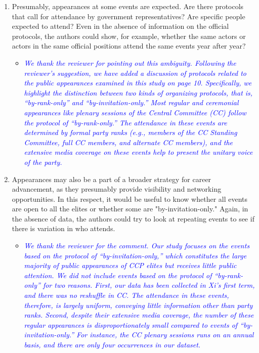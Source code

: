 \begin{enumerate}
 \item Presumably, appearances at some events are expected. Are there protocols that call for attendance by government representatives? Are specific people expected to attend?  Even in the absence of information on the official protocols, the authors could show, for example, whether the same actors or actors in the same official positions attend the same events year after year?
	\begin{itemize}
		\item \textcolor{blue}{ \emph{
			We thank the reviewer for pointing out this ambiguity.  Following the reviewer's suggestion, we have added a discussion of protocols related to the public appearances examined in this study on page 10.  Specifically, we highlight the distinction between two kinds of organizing protocols, that is, “by-rank-only” and “by-invitation-only.”  Most regular and ceremonial appearances like plenary sessions of the Central Committee (CC) follow the protocol of “by-rank-only.”  The attendance in these events are determined by formal party ranks (e.g., members of the CC Standing Committee, full CC members, and alternate CC members), and the extensive media coverage on these events help to present the unitary voice of the party.
		}}
	\end{itemize}
	\item Appearances may also be a part of a broader strategy for career advancement, as they presumably provide visibility and networking opportunities. In this respect, it would be useful to know whether all events are open to all the elites or whether some are "by-invitation-only."  Again, in the absence of data, the authors could try to look at repeating events to see if there is variation in who attends.
	\begin{itemize}
		\item \textcolor{blue}{ \emph{
			We thank the reviewer for the comment. Our study focuses on the events based on the protocol of “by-invitation-only,” which constitutes the large majority of public appearances of CCP elites but receives little public attention.  We did not include events based on the protocol of “by-rank-only” for two reasons.  First, our data has been collected in Xi’s first term, and there was no reshuffle in CC.  The attendance in these events, therefore, is largely uniform, conveying little information other than party ranks.  Second, despite their extensive media coverage, the number of these regular appearances is disproportionately small compared to events of “by-invitation-only.”  For instance, the CC plenary sessions runs on an annual basis, and there are only four occurrences in our dataset.
}}
\end{itemize}
\end{enumerate}
